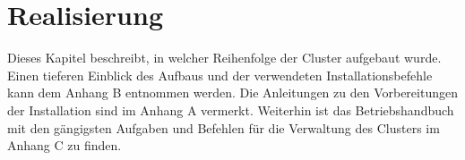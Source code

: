 \newpage
\section{Realisierung} 
\label{sec:Realisierung}
Dieses Kapitel beschreibt, in welcher Reihenfolge der Cluster aufgebaut wurde. Einen tieferen Einblick des Aufbaus und der verwendeten Installationsbefehle kann dem Anhang B entnommen werden. Die Anleitungen zu den Vorbereitungen der Installation sind im Anhang A vermerkt. Weiterhin ist das Betriebshandbuch mit den gängigsten Aufgaben und Befehlen für die Verwaltung des Clusters im Anhang C zu finden.




